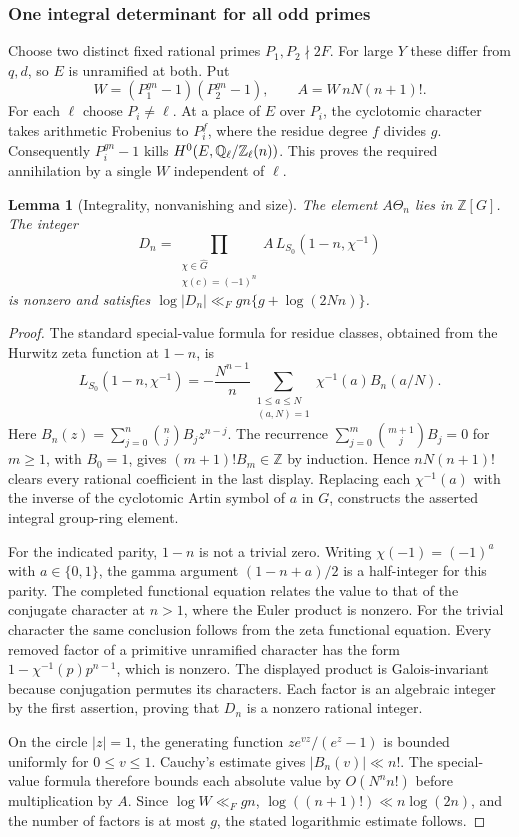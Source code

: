 \documentclass[a4paper,11pt]{article}
\newtheorem{lemma}[proposition]{Lemma}
\theoremstyle{definition}
\theoremstyle{remark}
\newcommand{\ZZ}{\mathbb Z}\newcommand{\ord}{\operatorname{ord}}
\numberwithin{equation}{section}
\begin{document}
\subsubsection{One integral determinant for all odd primes}\label{nav:II-02}
Choose two distinct fixed rational primes \(P_1,P_2\nmid2F\). For large \(Y\) these differ from \(q,d\), so \(E\) is unramified at both. Put
\[
 W=(P_1^{gn}-1)(P_2^{gn}-1),\qquad A=W\,nN(n+1)! .
\]
For each \(\ell\) choose \(P_i\ne\ell\). At a place of \(E\) over \(P_i\), the cyclotomic character takes arithmetic Frobenius to \(P_i^f\), where the residue degree \(f\) divides \(g\). Consequently \(P_i^{gn}-1\) kills \(H^0(E,\QQ_\ell/\ZZ_\ell(n))\). This proves the required annihilation by a single \(W\) independent of \(\ell\).

\begin{lemma}[Integrality, nonvanishing and size]\label{lem:int13}
The element \(A\Theta_n\) lies in \(\ZZ[G]\). The integer
\[
 D_n=\prod_{\substack{\chi\in\widehat G\\\chi(c)=(-1)^n}}
             A\,L_{S_0}(1-n,\chi^{-1})
\]
is nonzero and satisfies \(\log|D_n|\ll_F gn\{g+\log(2Nn)\}\).
\end{lemma}
\begin{proof}
The standard special-value formula for residue classes, obtained from the Hurwitz zeta function at \(1-n\), is
\[
 L_{S_0}(1-n,\chi^{-1})=
    -\frac{N^{n-1}}{n}
      \sum_{\substack{1\le a\le N\\(a,N)=1}}\chi^{-1}(a)B_n(a/N).
\]
Here \(B_n(z)=\sum_{j=0}^n\binom{n}{j}B_j z^{n-j}\). The recurrence \(\sum_{j=0}^m\binom{m+1}{j}B_j=0\) for \(m\ge1\), with \(B_0=1\), gives \((m+1)!B_m\in\ZZ\) by induction. Hence \(nN(n+1)!\) clears every rational coefficient in the last display. Replacing each \(\chi^{-1}(a)\) with the inverse of the cyclotomic Artin symbol of \(a\) in \(G\), constructs the asserted integral group-ring element.~\cite{II-II-II-bernoulli13}

For the indicated parity, \(1-n\) is not a trivial zero. Writing \(\chi(-1)=(-1)^a\) with \(a\in\{0,1\}\), the gamma argument \((1-n+a)/2\) is a half-integer for this parity. The completed functional equation relates the value to that of the conjugate character at \(n>1\), where the Euler product is nonzero. For the trivial character the same conclusion follows from the zeta functional equation. Every removed factor of a primitive unramified character has the form \(1-\chi^{-1}(p)p^{n-1}\), which is nonzero. The displayed product is Galois-invariant because conjugation permutes its characters. Each factor is an algebraic integer by the first assertion, proving that \(D_n\) is a nonzero rational integer.

On the circle \(|z|=1\), the generating function \(ze^{vz}/(e^z-1)\) is bounded uniformly for \(0\le v\le1\). Cauchy's estimate gives \(|B_n(v)|\ll n!\). The special-value formula therefore bounds each absolute value by \(O(N^n n!)\) before multiplication by \(A\). Since \(\log W\ll_F gn\), \(\log((n+1)!)\ll n\log(2n)\), and the number of factors is at most \(g\), the stated logarithmic estimate follows.
\end{proof}
\end{document}
